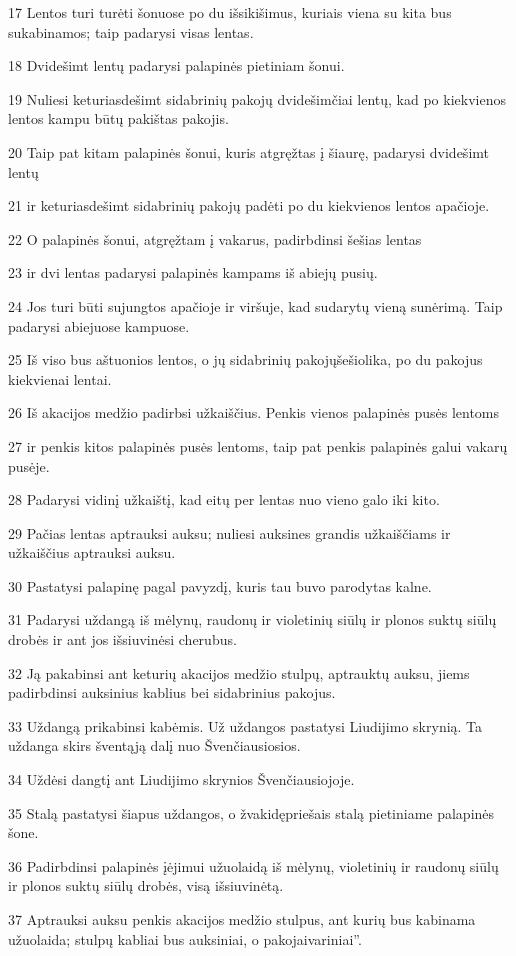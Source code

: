 \par 17 Lentos turi turėti šonuose po du išsikišimus, kuriais viena su kita bus sukabinamos; taip padarysi visas lentas. 
\par 18 Dvidešimt lentų padarysi palapinės pietiniam šonui. 
\par 19 Nuliesi keturiasdešimt sidabrinių pakojų dvidešimčiai lentų, kad po kiekvienos lentos kampu būtų pakištas pakojis. 
\par 20 Taip pat kitam palapinės šonui, kuris atgręžtas į šiaurę, padarysi dvidešimt lentų 
\par 21 ir keturiasdešimt sidabrinių pakojų padėti po du kiekvienos lentos apačioje. 
\par 22 O palapinės šonui, atgręžtam į vakarus, padirbdinsi šešias lentas 
\par 23 ir dvi lentas padarysi palapinės kampams iš abiejų pusių. 
\par 24 Jos turi būti sujungtos apačioje ir viršuje, kad sudarytų vieną sunėrimą. Taip padarysi abiejuose kampuose. 
\par 25 Iš viso bus aštuonios lentos, o jų sidabrinių pakojų­šešiolika, po du pakojus kiekvienai lentai. 
\par 26 Iš akacijos medžio padirbsi užkaiščius. Penkis vienos palapinės pusės lentoms 
\par 27 ir penkis kitos palapinės pusės lentoms, taip pat penkis palapinės galui vakarų pusėje. 
\par 28 Padarysi vidinį užkaištį, kad eitų per lentas nuo vieno galo iki kito. 
\par 29 Pačias lentas aptrauksi auksu; nuliesi auksines grandis užkaiščiams ir užkaiščius aptrauksi auksu. 
\par 30 Pastatysi palapinę pagal pavyzdį, kuris tau buvo parodytas kalne. 
\par 31 Padarysi uždangą iš mėlynų, raudonų ir violetinių siūlų ir plonos suktų siūlų drobės ir ant jos išsiuvinėsi cherubus. 
\par 32 Ją pakabinsi ant keturių akacijos medžio stulpų, aptrauktų auksu, jiems padirbdinsi auksinius kablius bei sidabrinius pakojus. 
\par 33 Uždangą prikabinsi kabėmis. Už uždangos pastatysi Liudijimo skrynią. Ta uždanga skirs šventąją dalį nuo Švenčiausiosios. 
\par 34 Uždėsi dangtį ant Liudijimo skrynios Švenčiausiojoje. 
\par 35 Stalą pastatysi šiapus uždangos, o žvakidę­priešais stalą pietiniame palapinės šone. 
\par 36 Padirbdinsi palapinės įėjimui užuolaidą iš mėlynų, violetinių ir raudonų siūlų ir plonos suktų siūlų drobės, visą išsiuvinėtą. 
\par 37 Aptrauksi auksu penkis akacijos medžio stulpus, ant kurių bus kabinama užuolaida; stulpų kabliai bus auksiniai, o pakojai­variniai”.




